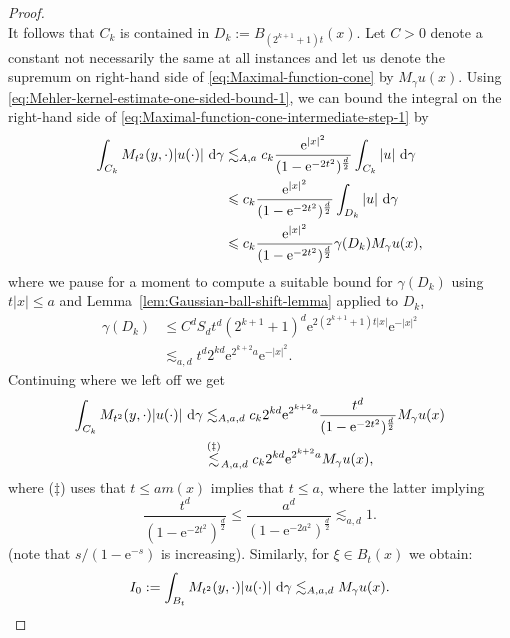 \documentclass{amsart}
\theoremstyle{remark}
\newcommand{\D}{\,\textup{d}}
\renewcommand{\leq}{\leqslant}
\newcommand{\e}{\mathrm{e}} %
\begin{document}
\begin{proof}
\begin{equation*}
  \end{equation*}
  It follows that $C_k$ is contained in $D_k := B_{(2^{k + 1} + 1) t}(x)$.
  Let $C > 0$ denote a constant not necessarily the same at all
  instances and let us denote the supremum on right-hand side of
  \eqref{eq:Maximal-function-cone} by $M_\gamma u (x)$. Using
  \eqref{eq:Mehler-kernel-estimate-one-sided-bound-1}, we can bound the
  integral on the right-hand side of
  \eqref{eq:Maximal-function-cone-intermediate-step-1} by
  \begin{align*}
    \int_{C_k}  M_{t^2}(y, \cdot) |u(\cdot)| \,\D\gamma & \lesssim_{A, a}
    c_k \frac{\e^{|x|^2}}{(1 - \e^{-2t^2})^{\frac{d}2}}   \int_{C_k}
    |u| \,\D\gamma\\ 
    &\leq c_k \frac {\e^{|x|^2}} {(1 -
      \e^{-2t^2})^{\frac{d}2}} \int_{D_k} |u| \,\D\gamma\\ 
    &\leq c_k \frac{\e^{|x|^2}}{(1 - \e^{-2t^2})^{\frac{d}2}} \gamma(D_k) M_\gamma u(x),
  \end{align*}
  where we pause for a moment to compute a suitable bound for
  $\gamma(D_k)$ using $t|x| \leq a$ and Lemma~\ref{lem:Gaussian-ball-shift-lemma} applied to
  $D_k$,
  \begin{align*}
    \gamma(D_k) &\leq C^d S_d t^d (2^{k + 1} + 1)^d \e^{2(2^{k + 1}
      + 1) t |x|} \e^{-|x|^2}\\
    &\lesssim_{a, d} t^d 2^{k d} \e^{2^{k + 2} a} \e^{-|x|^2}.
  \end{align*}
  Continuing where we left off we get
  \begin{align*}
    \int_{C_k}  M_{t^2}(y, \cdot) |u(\cdot)| \,\D\gamma &\lesssim_{A,
      a, d} c_k 2^{k d} \e^{2^{k + 2} a} \frac{t^d}{(1 -
      \e^{-2t^2})^{\frac{d}2}} M_\gamma u(x)\\
    &\overset{(\ddagger)}{\lesssim}_{A, a, d} c_k 2^{k d} \e^{2^{k + 2} a} M_\gamma u(x),
  \end{align*}
  where ($\ddagger$) uses that $t \leq a m(x)$ implies that $t\leq a$,
  where the latter implying
 \begin{equation*}
    \frac{t^d}{(1 - \e^{-2t^2})^{\frac{d}2}} \leq
     \frac{a^d}{(1 - \e^{-2a^2})^{\frac{d}2}} \lesssim_{a, d} 1.
  \end{equation*}
  (note that $s/(1-\e^{-s})$ is increasing). Similarly, for $\xi \in B_t(x)$ we
 obtain:
   \begin{equation*}
    I_0 := \int_{B_t}  M_{t^2}(y, \cdot) |u(\cdot)| \,\D\gamma \lesssim_{A,
      a, d} M_\gamma u(x).
  \end{equation*}

\end{proof}
\end{document}
